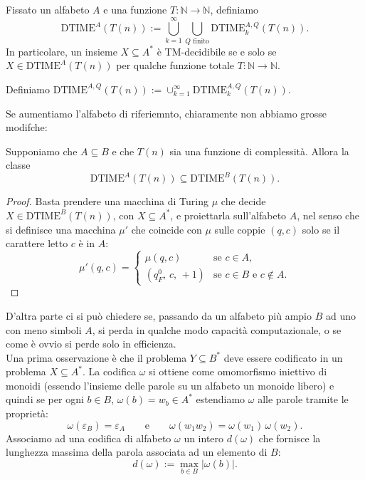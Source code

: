\begin{defi}
Fissato un alfabeto $A$ e una funzione $T: \mathbb{N} \to \mathbb{N}$, definiamo
\[
\mathrm{DTIME}^A(T(n)) := \bigcup_{k=1}^{\infty} \bigcup_{Q \text{ finito}} \mathrm{DTIME}_k^{A,Q}(T(n)).
\]
In particolare, un insieme $X \subseteq A^*$ è TM-decidibile se e solo se $X \in \mathrm{DTIME}^A(T(n))$ per qualche funzione totale $T: \mathbb{N} \to \mathbb{N}$.
\end{defi}
\begin{defi}
    Definiamo
     $\mathrm{DTIME}^{A,Q}(T(n)):=\cup_{k=1}^\infty\mathrm{DTIME}^{A,Q}_k(T(n))$.
\end{defi}
Se aumentiamo l'alfabeto di riferiemnto, chiaramente non abbiamo grosse modifche:
\begin{lemm}
Supponiamo che $A \subseteq B$ e che $T(n)$ sia una funzione di complessità.
Allora la classe
\[
  \mathrm{DTIME}^A(T(n)) \subseteq \mathrm{DTIME}^B(T(n)).
\]
\begin{proof}
Basta prendere una macchina di Turing $\mu$ che decide $X \in \mathrm{DTIME}^B(T(n))$,
con $X \subseteq A^*$, e proiettarla sull'alfabeto $A$, nel senso che si definisce una
macchina $\mu'$ che coincide con $\mu$ sulle coppie $(q,c)$ solo se il carattere letto
$c$ è in $A$:
\[
  \mu'(q,c) =
  \begin{cases}
    \mu(q,c) & \text{se } c \in A,\\
    (q_F^0,\, c,\, +1) & \text{se } c \in B \text{ e } c \notin A.
  \end{cases}
\]
\end{proof}
\end{lemm}
D'altra parte ci si può chiedere 
se, 
passando da un alfabeto più ampio $B$
 ad uno con
meno simboli $A$, si 
perda in qualche modo 
capacità computazionale, 
o se come è ovvio
si perde solo in efficienza.
\\
Una prima osservazione è che il problema $Y \subseteq B^*$ deve essere codificato in un
problema $X \subseteq A^*$. La codifica $\omega$ si ottiene come omomorfismo iniettivo di
monoidi (essendo l'insieme delle parole su un alfabeto un monoide libero) e quindi se
per ogni $b \in B$, $\omega(b) = w_b \in A^*$ estendiamo $\omega$ alle parole tramite le
proprietà:
\[
  \omega(\varepsilon_B) = \varepsilon_A
  \qquad\text{e}\qquad
  \omega(w_1 w_2) = \omega(w_1)\,\omega(w_2).
\]
Associamo ad una codifica di alfabeto $\omega$ un intero $d(\omega)$ che fornisce la
lunghezza massima della parola associata ad un elemento di $B$:
\[
  d(\omega) := \max_{b \in B} |\omega(b)|.
\]

